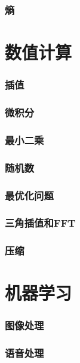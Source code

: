 \documentclass[UTF8]{ctexart}
\newcommand{\sectionbreak}{\clearpage}
\begin{document}
\section{熵}


\sectionbreak
\part{数值计算}

\section{插值}

\section{微积分}

\section{最小二乘}

\section{随机数}

\section{最优化问题}

\section{三角插值和FFT}

\section{压缩}

\sectionbreak
\part{机器学习}

\section{图像处理}
\sectionbreak

\section{语音处理}
\sectionbreak
\end{document}
